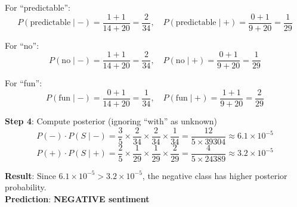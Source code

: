 \documentclass[11pt,a4paper]{article}
\begin{document}
\begin{tcolorbox}[colback=green!5!white,colframe=green!75!black,title=\textbf{Numerical: Naive Bayes Sentiment Classification}]
For ``predictable'':
\[
P(\text{predictable} \mid -) = \frac{1+1}{14+20} = \frac{2}{34}, \quad
P(\text{predictable} \mid +) = \frac{0+1}{9+20} = \frac{1}{29}
\]

For ``no'':
\[
P(\text{no} \mid -) = \frac{1+1}{14+20} = \frac{2}{34}, \quad
P(\text{no} \mid +) = \frac{0+1}{9+20} = \frac{1}{29}
\]

For ``fun'':
\[
P(\text{fun} \mid -) = \frac{0+1}{14+20} = \frac{1}{34}, \quad
P(\text{fun} \mid +) = \frac{1+1}{9+20} = \frac{2}{29}
\]

\textbf{Step 4}: Compute posterior (ignoring ``with'' as unknown)
\[
P(-) \cdot P(S \mid -) = \frac{3}{5} \times \frac{2}{34} \times \frac{2}{34} \times \frac{1}{34} = \frac{12}{5 \times 39304} \approx 6.1 \times 10^{-5}
\]
\[
P(+) \cdot P(S \mid +) = \frac{2}{5} \times \frac{1}{29} \times \frac{1}{29} \times \frac{2}{29} = \frac{4}{5 \times 24389} \approx 3.2 \times 10^{-5}
\]

\textbf{Result}: Since $6.1 \times 10^{-5} > 3.2 \times 10^{-5}$, the negative class has higher posterior probability.\\
\textbf{Prediction}: \textbf{NEGATIVE sentiment}
\end{tcolorbox}
\end{document}
